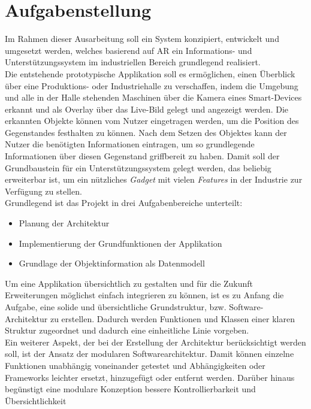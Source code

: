 \section{Aufgabenstellung}
\label{chap:Aufgabenstellung}          %
Im Rahmen dieser Ausarbeitung soll ein System konzipiert, entwickelt und umgesetzt werden, welches basierend auf \acl{AR} ein 
Informations- und Unterstützungssystem im industriellen Bereich grundlegend realisiert.
\\
Die entstehende prototypische Applikation soll es ermöglichen, einen Überblick über eine Produktions- oder Industriehalle zu 
verschaffen, indem die Umgebung und alle in der Halle stehenden Maschinen über die Kamera eines Smart-Devices erkannt und als 
Overlay über das Live-Bild gelegt und angezeigt werden. Die erkannten Objekte können vom Nutzer eingetragen werden, um die Position des 
Gegenstandes festhalten zu können. Nach dem Setzen des Objektes kann der Nutzer die benötigten Informationen eintragen, um so 
grundlegende Informationen über diesen Gegenstand griffbereit zu haben. Damit soll der Grundbaustein für ein 
Unterstützungssystem gelegt werden, das beliebig erweiterbar ist, um ein nützliches \textit{Gadget} mit vielen \textit{Features} 
in der Industrie zur Verfügung zu stellen.
\\ 
\linebreak
Grundlegend ist das Projekt in drei Aufgabenbereiche unterteilt:
\begin{itemize}
    \item Planung der Architektur
    \item Implementierung der Grundfunktionen der Applikation
    \item Grundlage der Objektinformation als Datenmodell 
\end{itemize}
Um eine Applikation übersichtlich zu gestalten und für die Zukunft Erweiterungen 
möglichst einfach integrieren zu können, ist es zu Anfang die Aufgabe, eine solide und übersichtliche Grundstruktur, bzw. Software-
Architektur zu erstellen. Dadurch werden Funktionen und Klassen einer klaren Struktur zugeordnet und dadurch eine einheitliche Linie vorgeben. 
\\
Ein weiterer Aspekt, der bei der Erstellung der Architektur berücksichtigt werden soll, ist der Ansatz der modularen 
Softwarearchitektur. Damit können einzelne Funktionen unabhängig voneinander getestet und Abhängigkeiten oder Frameworks leichter 
ersetzt, hinzugefügt oder entfernt werden. Darüber hinaus begünstigt eine modulare Konzeption bessere Kontrollierbarkeit und Übersichtlichkeit 
